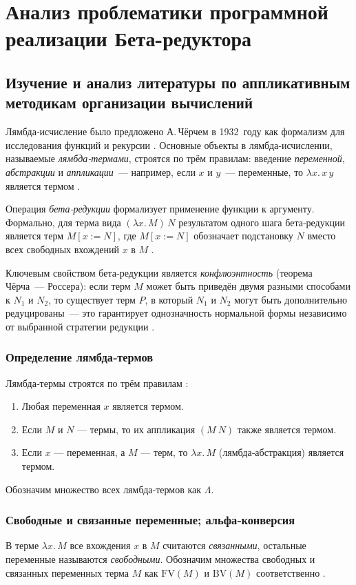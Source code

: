 \chapter{Анализ проблематики программной реализации Бета-редуктора}
\label{chapter1}

\section{Изучение и анализ литературы по аппликативным методикам организации вычислений}

Лямбда‑исчисление было предложено А. Чёрчем в 1932 году как формализм для исследования функций и рекурсии \cite{ChurchRosser}. Основные объекты в лямбда‑исчислении, называемые \emph{лямбда‑термами}, строятся по трём правилам: введение \emph{переменной}, \emph{абстракции} и \emph{аппликации} — например, если $x$ и $y$ — переменные, то $\lambda x.\,x\,y$ является термом .  

Операция \emph{бета‑редукции} формализует применение функции к аргументу. Формально, для терма вида $(\lambda x.\,M)\,N$ результатом одного шага бета‑редукции является терм $M[x := N]$, где $M[x := N]$ обозначает подстановку $N$ вместо всех свободных вхождений $x$ в $M$ .  

Ключевым свойством бета‑редукции является \emph{конфлюэнтность} (теорема Чёрча — Россера): если терм $M$ может быть приведён двумя разными способами к $N_1$ и $N_2$, то существует терм $P$, в который $N_1$ и $N_2$ могут быть дополнительно редуцированы — это гарантирует однозначность нормальной формы независимо от выбранной стратегии редукции .  
\label{sec:theory-beta}
\subsection{Определение лямбда‑термов}
Лямбда‑термы строятся по трём правилам \cite{Barendregt1984}:
\begin{enumerate}
  \item Любая переменная \(x\) является термом.
  \item Если \(M\) и \(N\) — термы, то их аппликация \((M\ N)\) также является термом.
  \item Если \(x\) — переменная, а \(M\) — терм, то \(\lambda x.\,M\) (лямбда‑абстракция) является термом.
\end{enumerate}
Обозначим множество всех лямбда‑термов как \(\Lambda\).  

\subsection{Свободные и связанные переменные; альфа‑конверсия}
В терме \(\lambda x.\,M\) все вхождения \(x\) в \(M\) считаются \emph{связанными}, остальные переменные называются \emph{свободными}. Обозначим множества свободных и связанных переменных терма \(M\) как \(\mathrm{FV}(M)\) и \(\mathrm{BV}(M)\) соответственно \cite{HindleySeldin2008}.  

